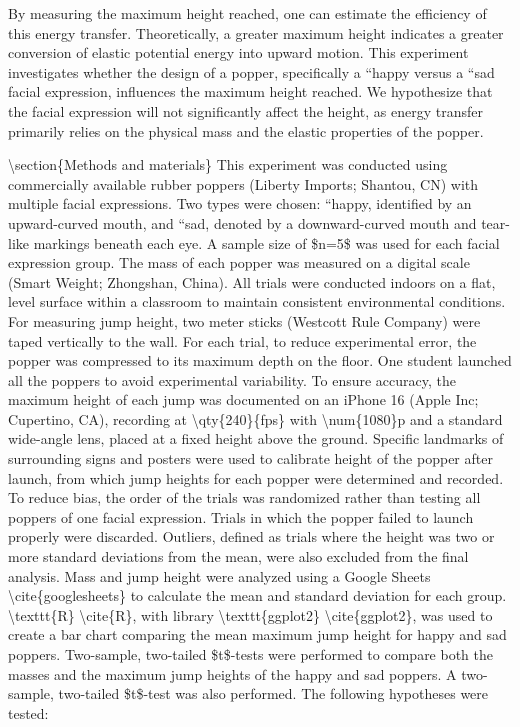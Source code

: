 By measuring the maximum height reached, one can estimate the efficiency
of this energy transfer. Theoretically, a greater maximum height
indicates a greater conversion of elastic potential energy into upward
motion. This experiment investigates whether the design of a popper,
specifically a ``happy\textquotesingle\textquotesingle{} versus a
``sad\textquotesingle\textquotesingle{} facial expression, influences
the maximum height reached. We hypothesize that the facial expression
will not significantly affect the height, as energy transfer primarily
relies on the physical mass and the elastic properties of the popper.

\textbackslash section\{Methods and materials\} This experiment was
conducted using commercially available rubber poppers (Liberty Imports;
Shantou, CN) with multiple facial expressions. Two types were chosen:
``happy,\textquotesingle\textquotesingle{} identified by an
upward-curved mouth, and ``sad,\textquotesingle\textquotesingle{}
denoted by a downward-curved mouth and tear-like markings beneath each
eye. A sample size of \$n=5\$ was used for each facial expression group.
The mass of each popper was measured on a digital scale (Smart Weight;
Zhongshan, China). All trials were conducted indoors on a flat, level
surface within a classroom to maintain consistent environmental
conditions. For measuring jump height, two meter sticks (Westcott Rule
Company) were taped vertically to the wall. For each trial, to reduce
experimental error, the popper was compressed to its maximum depth on
the floor. One student launched all the poppers to avoid experimental
variability. To ensure accuracy, the maximum height of each jump was
documented on an iPhone 16 (Apple Inc; Cupertino, CA), recording at
\textbackslash qty\{240\}\{fps\} with \textbackslash num\{1080\}p and a
standard wide-angle lens, placed at a fixed height above the ground.
Specific landmarks of surrounding signs and posters were used to
calibrate height of the popper after launch, from which jump heights for
each popper were determined and recorded. To reduce bias, the order of
the trials was randomized rather than testing all poppers of one facial
expression. Trials in which the popper failed to launch properly were
discarded. Outliers, defined as trials where the height was two or more
standard deviations from the mean, were also excluded from the final
analysis. Mass and jump height were analyzed using a Google Sheets
\textbackslash cite\{googlesheets\} to calculate the mean and standard
deviation for each group. \textbackslash texttt\{R\}
\textbackslash cite\{R\}, with library \textbackslash texttt\{ggplot2\}
\textbackslash cite\{ggplot2\}, was used to create a bar chart comparing
the mean maximum jump height for happy and sad poppers. Two-sample,
two-tailed \$t\$-tests were performed to compare both the masses and the
maximum jump heights of the happy and sad poppers. A two-sample,
two-tailed \$t\$-test was also performed. The following hypotheses were
tested:

